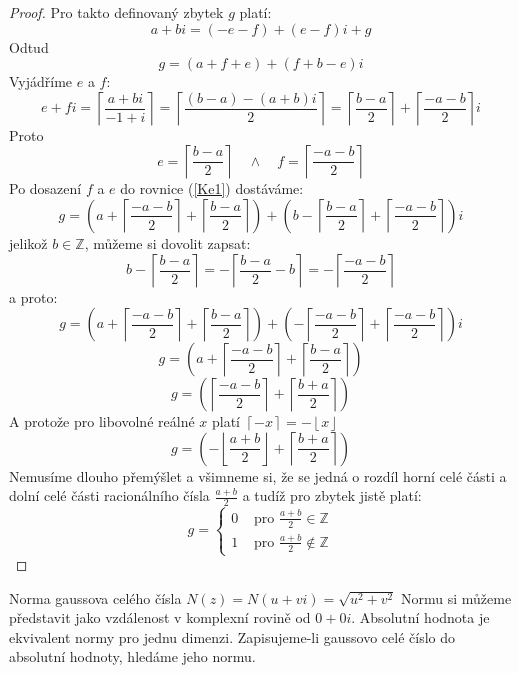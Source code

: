 \documentclass[czech,bachelor,dept470,male]{diploma}
\begin{document}
\begin{proof}\label{kompCeilProof}
	Pro takto definovaný zbytek $g$ platí:
	$$a+bi = (-e-f)+(e-f)i+g$$
	Odtud
	\begin{equation}\label{Ke1}
		g=(a+f+e)+(f+b-e)i
	\end{equation}
	Vyjádříme $e$ a $f$:
	$$e+fi = \left\lceil\frac{a+bi}{-1+i}\right\rceil=\left\lceil\frac{(b-a)-(a+b)i}{2}\right\rceil=\left\lceil\frac{b-a}{2}\right\rceil+\left\lceil\frac{-a-b}{2}\right\rceil i$$Proto
	$$ e = \left\lceil\frac{b-a}{2}\right\rceil\quad \land\quad f = \left\lceil\frac{-a-b}{2}\right\rceil$$
	Po dosazení $f$ a $e$ do rovnice (\ref{Ke1}) dostáváme:
	$$g=\left(a +\left\lceil\frac{-a-b}{2}\right\rceil+\left\lceil\frac{b-a}{2}\right\rceil\right)+\left(b-\left\lceil\frac{b-a}{2}\right\rceil+\left\lceil\frac{-a-b}{2}\right\rceil\right)i$$
	jelikož $b\in\mathbb{Z}$, můžeme si dovolit zapsat:
	$$b-\left\lceil\frac{b-a}{2}\right\rceil = -\left\lceil\frac{b-a}{2} -b\right\rceil = -\left\lceil\frac{-a-b}{2}\right\rceil$$
	a proto: $$g=\left(a +\left\lceil\frac{-a-b}{2}\right\rceil+\left\lceil\frac{b-a}{2}\right\rceil\right)+\left(-\left\lceil\frac{-a-b}{2}\right\rceil+\left\lceil\frac{-a-b}{2}\right\rceil\right)i$$$$g=\left(a +\left\lceil\frac{-a-b}{2}\right\rceil+\left\lceil\frac{b-a}{2}\right\rceil\right)$$
	$$g=\left(\left\lceil\frac{-a-b}{2}\right\rceil+\left\lceil\frac{b+a}{2}\right\rceil\right)$$
	A protože pro libovolné reálné $x$ platí $\left\lceil -x \right\rceil = - \left\lfloor x \right\rfloor$
	$$g=\left(-\left\lfloor\frac{a+b}{2}\right\rfloor+\left\lceil\frac{b+a}{2}\right\rceil\right)$$\newpage
	Nemusíme dlouho přemýšlet a všimneme si, že se jedná o rozdíl horní celé části a dolní celé části racionálního čísla $\frac{a+b}{2}$ a tudíž pro zbytek jistě platí:
	$$g=\begin{cases}
			0 & \mbox{ pro } \frac{a+b}{2}\in \mathbb{Z}     \\
			1 & \mbox{ pro } \frac{a+b}{2}\not\in \mathbb{Z}
		\end{cases}$$
\end{proof}
\begin{definition}Norma gaussova celého čísla \cite{norm}\newline
	$N(z) = N(u+vi) = \sqrt{u^2+v^2}$\newline
	Normu si můžeme představit jako vzdálenost v komplexní rovině od $0+0i$.
	Absolutní hodnota je ekvivalent normy pro jednu dimenzi. Zapisujeme-li gaussovo celé číslo do absolutní hodnoty, hledáme jeho normu.
\end{definition}
\end{document}
